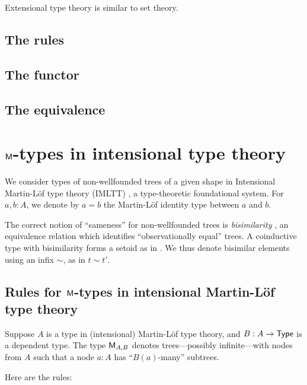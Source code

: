 \documentclass[envcountsame]{llncs}
\begin{document}
Extensional type theory is similar to set theory.

\subsection{The rules}

\subsection{The functor}

\subsection{The equivalence}

\section{$\mathsf{M}$-types in intensional type theory}

We consider types of non-wellfounded trees of a given shape in Intensional Martin-L\"of type theory (IMLTT) \parencite{martin_lof}, 
a type-theoretic foundational system.
For $a,b : A$, we denote by $a = b$ the Martin-L\"of identity type between $a$ and $b$.


The correct notion of \enquote{sameness} for non-wellfounded trees is \emph{bisimilarity} 
\parencite{DBLP:conf/types/Coquand93, DBLP:journals/corr/abs-cs-0603119},
an equivalence relation which identifies \enquote{observationally equal} trees.
A coinductive type with bisimilarity forms a setoid as in .
We thus denote bisimilar elements using an infix $\sim$, as in $t \sim t'$. 


\subsection{Rules for $\mathsf{M}$-types in intensional Martin-L\"of type theory}\label{sec:rules}



Suppose $A$ is a type in (intensional) Martin-L\"of type theory, and $B : A \to \mathsf{Type}$ is a dependent type.
The type $\mathsf{M}_{A,B}$ denotes trees---possibly infinite---with nodes 
from $A$ such that a node $a:A$ has \enquote{$B(a)$-many} subtrees.


Here are the rules:
\end{document}
